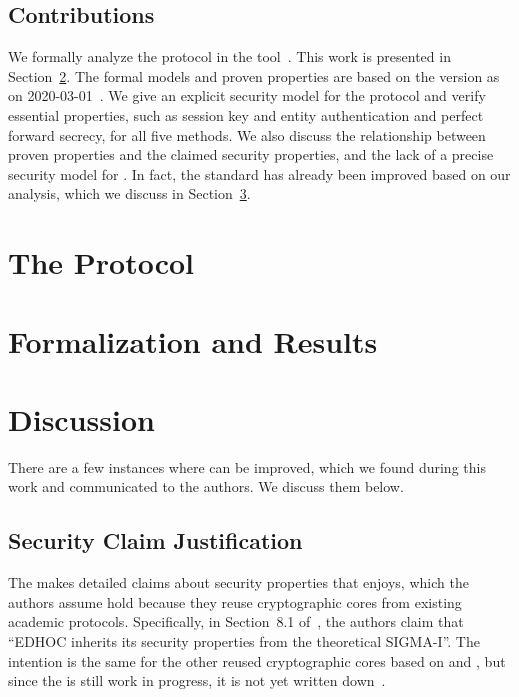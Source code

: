 \documentclass[runningheads, envcountsame, hidelinks, a4paper, x11names]{llncs}
\begin{document}
\subsection{Contributions}
\label{sec:contributions}
We formally analyze the \mEdhoc{} protocol in the \mTamarin{}
tool~\cite{DBLP:conf/cav/MeierSCB13}.
%
This work is presented in Section~\ref{sec:formalization}.
%
The formal models and proven properties are based on the version as on
2020-03-01~\cite{selander-lake-edhoc-01}.
%
We give an explicit security model for the protocol and verify essential
properties, such as session key and entity authentication and perfect forward
secrecy, for all five methods.
%
We also discuss the relationship between proven properties and the claimed
security properties, and the lack of a precise security model for \mEdhoc{}.
%
In fact, the standard has already been improved based on our analysis,
which we discuss in Section~\ref{sec:discussion}.
%

\section{The \mEdhoc{} Protocol}
\label{sec:edhoc}


\section{Formalization and Results}
\label{sec:formalization}


\section{Discussion}
\label{sec:discussion}
There are a few instances where \mEdhoc{} can be improved,
which we found during this work and communicated to the authors. We discuss them below.
%

\subsection{Security Claim Justification}
\label{sec:securityClaims}
The \mSpec{} makes detailed claims about security properties that \mEdhoc{}
enjoys, which the authors assume hold because they reuse cryptographic cores
from existing academic protocols.
%
Specifically, in Section~8.1 of~\cite{selander-lake-edhoc-01}, the authors
claim that ``EDHOC inherits its security properties from the theoretical
\mbox{SIGMA-I}''.
%
The intention is the same for the other reused cryptographic
cores based on \mOptls{} and \mNoise{}, but since the \mSpec{} is still work in
progress, it is not yet written down~\cite{personalCommunication}.
%
\end{document}
